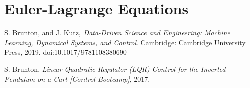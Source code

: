 \documentclass[a4 paper]{article}
\begin{document}
\section{Euler-Lagrange Equations}




\newpage
\begin{thebibliography}{9}

    S. Brunton, and J. Kutz,
    \textit{Data-Driven Science and Engineering: Machine Learning, Dynamical Systems, and Control}.
    Cambridge: Cambridge University Press, 2019.
    doi:10.1017/9781108380690
    
    S. Brunton,
    \textit{Linear Quadratic Regulator (LQR) Control for the Inverted Pendulum on a Cart [Control Bootcamp]}, 2017.
    
\end{thebibliography}
\end{document}
